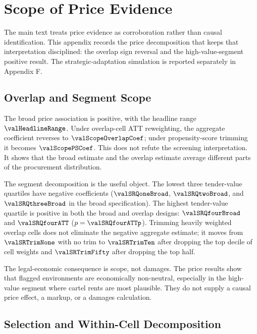 \section{Scope of Price Evidence}
\label{app:scope_adaptation_submission}

The main text treats price evidence as corroboration rather
than causal identification. This appendix records the price
decomposition that keeps that interpretation disciplined: the
overlap sign reversal and the high-value-segment positive
result. The strategic-adaptation simulation is reported
separately in Appendix F.

\subsection{Overlap and Segment Scope}
\label{app:overlap_scope_submission}

The broad price association is positive, with the headline range
$\valHeadlineRange$. Under overlap-cell ATT reweighting, the
aggregate coefficient reverses to $\valScopeOverlapCoef$; under
propensity-score trimming it becomes $\valScopePSCoef$. This
does not refute the screening interpretation. It shows that the
broad estimate and the overlap estimate average different parts
of the procurement distribution.

The segment decomposition is the useful object. The lowest three
tender-value quartiles have negative coefficients
($\valSRQoneBroad$, $\valSRQtwoBroad$, and
$\valSRQthreeBroad$ in the broad specification). The highest
tender-value quartile is positive in both the broad and overlap
designs: $\valSRQfourBroad$ and $\valSRQfourATT$
($p=\valSRQfourATTp$). Trimming heavily weighted overlap cells
does not eliminate the negative aggregate estimate; it moves from
$\valSRTrimNone$ with no trim to $\valSRTrimTen$ after dropping
the top decile of cell weights and $\valSRTrimFifty$ after
dropping the top half.

The legal-economic consequence is scope, not damages. The price
results show that flagged environments are economically
non-neutral, especially in the high-value segment where cartel
rents are most plausible. They do not supply a causal price
effect, a markup, or a damages calculation.

\subsection{Selection and Within-Cell Decomposition}
\label{app:price_decomposition_submission}

